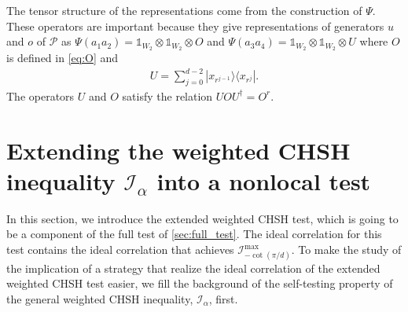 \documentclass[11pt,letterpaper]{article}
\newcommand{\ketbra}[2]{|#1\rangle\langle#2|}
\newcommand{\x}{\otimes}
\newcommand{\ct}{^{\dagger}}
\newcommand{\1}{\mathbb{1}}
\newcommand{\Pg}{\mathcal{P}}
\newcommand{\LS}{LS}
\newcommand{\I}{\mathcal{I}}
\newtheorem{proposition}[theorem]{Proposition}
\theoremstyle{definition}
\begin{document}
The tensor structure of the representations come from the construction of $\Psi$.
These operators are important because they give representations of generators 
$u$ and $o$ of $\Pg$ as $\Psi(a_1a_2) = \1_{W_2} \x \1_{W_2} \x O$
and $\Psi(a_3a_4) = \1_{W_2} \x \1_{W_2} \x U$ where $O$ is defined in \cref{eq:O} and
\begin{align}
    \label{eq:u1u2}
    U = \sum_{j=0}^{d-2} \ketbra{x_{r^{j-1}}}{x_{r^j}}.
\end{align}
The operators $U$ and $O$ satisfy the relation $UOU\ct = O^r$.



\section{Extending the weighted CHSH inequality $\I_\alpha$ into a nonlocal test}
\label{sec:ext_chsh}
In this section, we introduce the extended weighted CHSH test,
which is going to be a component of the full test of \cref{sec:full_test}.
The ideal correlation for this test contains the ideal correlation that 
achieves $\I_{-\cot(\pi/d)}^{\max}$. 
To make the study of the implication of a strategy that realize 
the ideal correlation of the extended weighted CHSH test easier,
we fill the background of the self-testing property of the
general weighted CHSH inequality, $\I_\alpha$, first.

\end{document}
